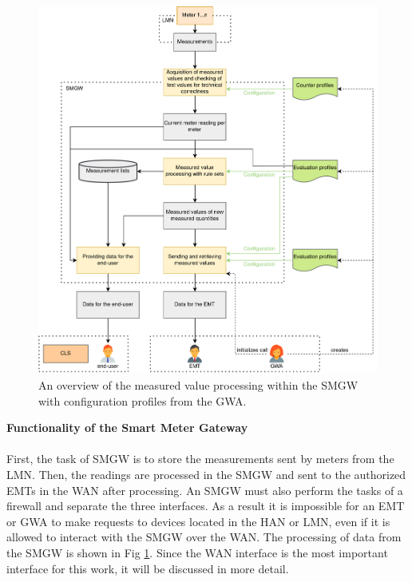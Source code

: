 \begin{figure}[tbp]
  \centering
  \includegraphics[width=1\textwidth]{images/MessverarbeitungEnglish2.png}
  \caption[Measured Value Processing in a SMGW]{An overview of the measured value processing within the \gls{SMGW} with configuration profiles from the GWA.}
  \label{fig:value_processing}
\end{figure}
\textbf{Functionality of the Smart Meter Gateway}\enlargethispage{\baselineskip}
\\
\\
First, the task of \gls{SMGW} is to store the measurements sent by meters from the \gls{LMN}. Then, the readings are processed in the \gls{SMGW} and sent to the authorized \gls{EMT}s in the \gls{WAN} after processing. An \gls{SMGW} must also perform the tasks of a firewall and separate the three interfaces. As a result it is impossible for an \gls{EMT} or \gls{GWA} to make requests to devices located in the \gls{HAN} or \gls{LMN}, even if it is allowed to interact with the \gls{SMGW} over the \gls{WAN}. The processing of data from the \gls{SMGW} is shown in Fig \ref{fig:value_processing}. Since the \gls{WAN} interface is the most important interface for this work, it will be discussed in more detail.\\
